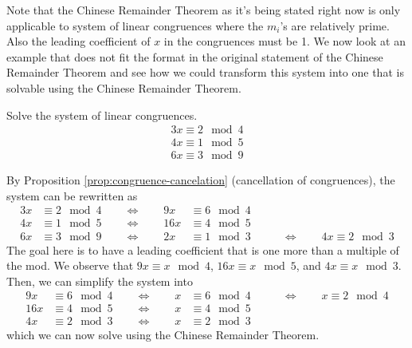 Note that the Chinese Remainder Theorem as it's being stated right now is only applicable to system of linear congruences where the $m_i$'s are relatively prime. Also the leading coefficient of $x$ in the congruences must be 1. We now look at an example that does not fit the format in the original statement of the Chinese Remainder Theorem and see how we could transform this system into one that is solvable using the Chinese Remainder Theorem.

\begin{example}
    Solve the system of linear congruences.
    $$
    \begin{aligned}
        3x \equiv 2 \mod 4 \\
        4x \equiv 1 \mod 5 \\
        6x \equiv 3 \mod 9
    \end{aligned}
    $$
\end{example}

By Proposition \ref{prop:congruence-cancelation} (cancellation of congruences), the system can be rewritten as
$$
\begin{aligned}
    3x &\equiv 2 \mod 4 \qquad \iff \qquad 9x &\equiv 6 \mod 4 &\\
    4x &\equiv 1 \mod 5 \qquad \iff \qquad 16x &\equiv 4 \mod 5 & \\
    6x &\equiv 3 \mod 9 \qquad \iff \qquad 2x &\equiv 1 \mod 3 & \qquad \iff \qquad 4x \equiv 2 \mod 3
\end{aligned}
$$
The goal here is to have a leading coefficient that is one more than a multiple of the mod. We observe that $9x \equiv x \mod 4$, $16x \equiv x \mod 5$, and $4x \equiv x \mod 3$. Then, we can simplify the system into
$$
\begin{aligned}
    9x &\equiv 6 \mod 4 \qquad \iff \qquad x &\equiv 6 \mod 4 & \qquad \iff \qquad x \equiv 2 \mod 4 \\
    16x &\equiv 4 \mod 5 \qquad \iff \qquad x &\equiv 4 \mod 5 & \\
    4x &\equiv 2 \mod 3 \qquad \iff \qquad x &\equiv 2 \mod 3 &
\end{aligned}
$$
which we can now solve using the Chinese Remainder Theorem.